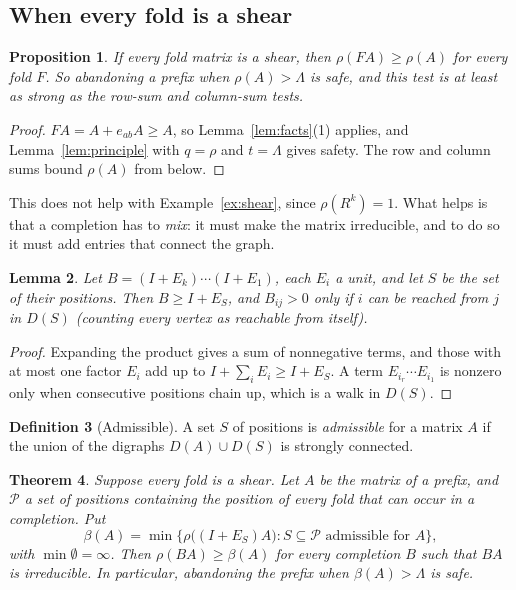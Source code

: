 \documentclass[11pt]{amsart}
\newcommand{\Lam}{\Lambda}
\newcommand{\D}{D}
\newcommand{\Pos}{\mathcal{P}}
\theoremstyle{plain}
\newtheorem{Theorem}{Theorem}[section]
\newtheorem{Proposition}[Theorem]{Proposition}
\newtheorem{Lemma}[Theorem]{Lemma}
\theoremstyle{definition}
\newtheorem{Definition}[Theorem]{Definition}
\begin{document}
\subsection{When every fold is a shear}

\begin{Proposition}
  \label{prop:rhomono}
  If every fold matrix is a shear, then $\rho(FA)\ge\rho(A)$ for every fold
  $F$.  So abandoning a prefix when $\rho(A)>\Lam$ is safe, and this test
  is at least as strong as the row-sum and column-sum tests.
\end{Proposition}

\begin{proof}
  $FA=A+e_{ab}A\ge A$, so Lemma~\ref{lem:facts}(1) applies, and
  Lemma~\ref{lem:principle} with $q=\rho$ and $t=\Lam$ gives safety.  The
  row and column sums bound $\rho(A)$ from below.
\end{proof}

This does not help with Example~\ref{ex:shear}, since $\rho(R^k)=1$.  What
helps is that a completion has to \emph{mix}: it must make the matrix
irreducible, and to do so it must add entries that connect the graph.

\begin{Lemma}
  \label{lem:expand}
  Let $B=(I+E_k)\cdots(I+E_1)$, each $E_i$ a unit, and let $S$ be the set of
  their positions.  Then $B\ge I+E_S$, and $B_{ij}>0$ only if $i$ can be
  reached from $j$ in $\D(S)$ (counting every vertex as reachable from
  itself).
\end{Lemma}

\begin{proof}
  Expanding the product gives a sum of nonnegative terms, and those with at
  most one factor $E_i$ add up to $I+\sum_iE_i\ge I+E_S$.  A term
  $E_{i_r}\cdots E_{i_1}$ is nonzero only when consecutive positions chain
  up, which is a walk in $\D(S)$.
\end{proof}

\begin{Definition}[Admissible]
  \label{def:admissible}
  A set $S$ of positions is \emph{admissible} for a matrix $A$ if the
  union of the digraphs $\D(A)\cup\D(S)$ is strongly connected.
\end{Definition}

\begin{Theorem}
  \label{thm:rauzy}
  Suppose every fold is a shear.  Let $A$ be the matrix of a prefix, and
  $\Pos$ a set of positions containing the position of every fold that can
  occur in a completion.  Put
  \[
    \beta(A)=\min\bigl\{\rho\bigl((I+E_S)A\bigr) :
      S\subseteq\Pos\text{ admissible for }A\bigr\},
  \]
  with $\min\emptyset=\infty$.  Then $\rho(BA)\ge\beta(A)$ for every
  completion $B$ such that $BA$ is irreducible.  In particular, abandoning
  the prefix when $\beta(A)>\Lam$ is safe.
\end{Theorem}
\end{document}
